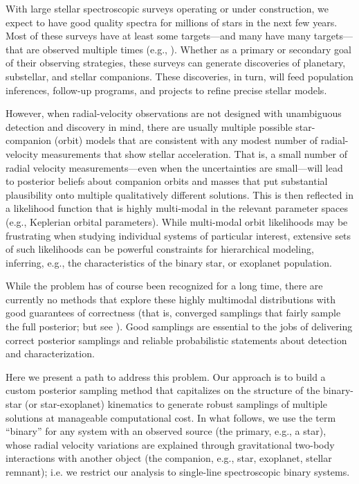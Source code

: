 \documentclass[manuscript, letterpaper]{aastex6}
\newcommand{\resp}[1]{{\color{mahogany}#1}}
\begin{document}
With large stellar spectroscopic surveys operating or under
construction, we expect to have good quality spectra for millions
of stars in the next few years.
Most of these surveys have at least some targets---and many have many
targets---that are observed multiple times (e.g., \citealt{Majewski:2015}).
Whether as a primary or secondary goal of their observing
strategies, these surveys can generate discoveries of planetary,
substellar, and stellar companions.
These discoveries, in turn, will feed population inferences, follow-up
programs, and projects to refine precise stellar models.

However, when radial-velocity observations are not designed with
unambiguous detection and discovery in mind, there are usually
multiple possible star-companion (orbit) models that are consistent with any
modest number of radial-velocity measurements that show stellar
acceleration.
That is, a small number of radial velocity measurements---even when the
uncertainties are small---will lead to posterior beliefs about companion
orbits and masses that put substantial plausibility onto multiple
qualitatively different solutions.
This is then reflected in a likelihood function that is highly multi-modal in
the relevant parameter spaces (e.g., Keplerian orbital parameters).
While multi-modal orbit likelihoods may be frustrating when studying individual
systems of particular interest, extensive sets of such likelihoods can
be powerful constraints for hierarchical modeling, inferring, e.g., the
characteristics of the binary star, or exoplanet population.

While the problem has of course been recognized for a long time, there
are currently no methods that explore these highly multimodal
\resp{distributions} with good guarantees of correctness (that is, converged
samplings that fairly sample the full posterior; but see
\citealt{Gregory:2005,Brewer:2015}).
Good samplings are essential to the jobs of
delivering correct posterior samplings and reliable probabilistic statements
about detection and characterization.

Here we present a path to address this problem.
Our approach is to build a custom posterior sampling method that capitalizes on
the structure of the binary-star (or star-exoplanet) kinematics to generate
robust samplings of multiple solutions at manageable computational cost.
In what follows, we use the term ``binary'' for any system with an observed
source (the primary, e.g., a star), whose radial velocity variations are
explained through gravitational two-body interactions with another object (the
companion, e.g., star, exoplanet, stellar remnant); i.e. we restrict our
analysis to single-line spectroscopic binary systems.
\end{document}
